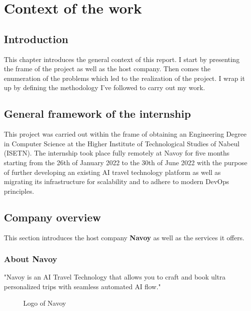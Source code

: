 \chapter{Context of the work}
\minitoc
\newpage

\setcounter{secnumdepth}{0} %
\section{Introduction}
This chapter introduces the general context of this report.
I start by presenting the frame of the project as well as the host company.
Then comes the enumeration of the problems which led to the realization of the project.
I wrap it up by defining the methodology I've followed to carry out my work.

\setcounter{secnumdepth}{2} %

\section{General framework of the internship}
This project was carried out within the frame of obtaining an Engineering Degree in Computer Science at the Higher Institute of Technological Studies of Nabeul (ISETN).
The internship took place fully remotely at Navoy for five months starting from the 26th of January 2022 to the 30th of June 2022 with the purpose of further developing an existing AI travel technology platform as well as migrating its infrastructure for scalability and to adhere to modern DevOps principles.

\section{Company overview}
This section introduces the host company {\bf Navoy} as well as the services it offers.
\subsection{About Navoy}
"Navoy is an AI Travel Technology that allows you to craft and book ultra personalized trips with seamless automated AI flow." \cite{about-navoy}
\begin{figure}[H]
  \centering
  \caption{Logo of Navoy}
  \label{fig:logo-of-navoy}
\end{figure}


